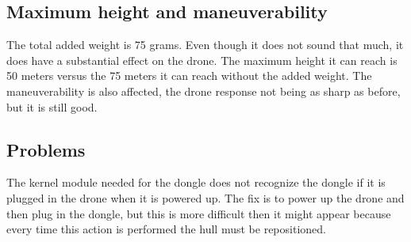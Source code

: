 \subsection{Maximum height and maneuverability}

The total added weight is 75 grams. Even though it does not sound that much, it does have a substantial effect on the drone. The maximum height it can reach is 50 meters versus the 75 meters it can reach without the added weight. The maneuverability is also affected, the drone response not being as sharp as before, but it is still good.

\subsection{Problems}

The kernel module needed for the dongle does not recognize the dongle if it is plugged in the drone when it is powered up. The fix is to power up the drone and then plug in the dongle, but this is more difficult then it might appear because every time this action is performed the hull must be repositioned.

\clearpage
